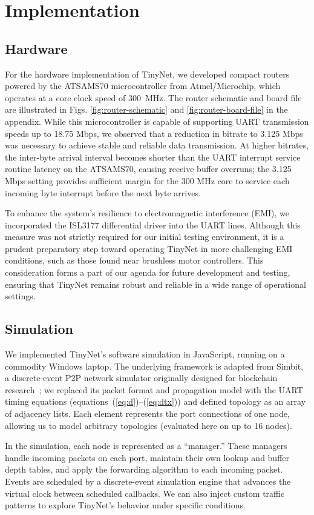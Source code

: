 \section{Implementation}
\subsection{Hardware}
For the hardware implementation of TinyNet, we developed compact routers powered by the ATSAMS70 microcontroller from Atmel/Microchip, which operates at a core clock speed of 300~MHz. The router schematic and board file are illustrated in Figs. \ref{fig:router-schematic} and \ref{fig:router-board-file} in the appendix. While this microcontroller is capable of supporting UART transmission speeds up to 18.75 Mbps, we observed that a reduction in bitrate to 3.125 Mbps was necessary to achieve stable and reliable data transmission. At higher bitrates, the inter-byte arrival interval becomes shorter than the UART interrupt service routine latency on the ATSAMS70, causing receive buffer overruns; the 3.125 Mbps setting provides sufficient margin for the 300 MHz core to service each incoming byte interrupt before the next byte arrives.

To enhance the system's resilience to electromagnetic interference (EMI), we incorporated the ISL3177 differential driver into the UART lines. Although this measure was not strictly required for our initial testing environment, it is a prudent preparatory step toward operating TinyNet in more challenging EMI conditions, such as those found near brushless motor controllers. This consideration forms a part of our agenda for future development and testing, ensuring that TinyNet remains robust and reliable in a wide range of operational settings.

\subsection{Simulation}
We implemented TinyNet's software simulation in JavaScript, running on a commodity Windows laptop. The underlying framework is adapted from Simbit, a discrete-event P2P network simulator originally designed for blockchain research~\cite{simbit}; we replaced its packet format and propagation model with the UART timing equations (equations~(\ref{eq:d})--(\ref{eq:dtx})) and defined topology as an array of adjacency lists. Each element represents the port connections of one node, allowing us to model arbitrary topologies (evaluated here on up to 16 nodes).

In the simulation, each node is represented as a ``manager.'' These managers handle incoming packets on each port, maintain their own lookup and buffer depth tables, and apply the forwarding algorithm to each incoming packet. Events are scheduled by a discrete-event simulation engine that advances the virtual clock between scheduled callbacks. We can also inject custom traffic patterns to explore TinyNet's behavior under specific conditions.